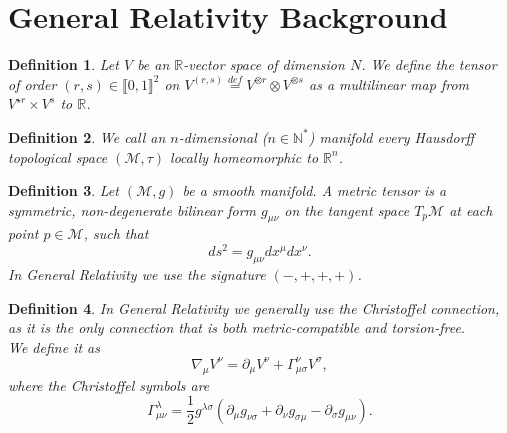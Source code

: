 \documentclass{article}
\newtheorem{definition}{Definition}
\begin{document}
\section{General Relativity Background} \label{RGreminder}
\begin{definition}
Let $V$ be an $\mathbb{R}$-vector space of dimension $N$. We define the tensor of order $(r,s) \in  \llbracket 0 ,1 \rrbracket^2$ on $V^{(r,s)} \overset{def}{=} V^{\otimes r} \otimes V^{\otimes s}$
as a multilinear map from $ V^{\star r} \times V^{ s}$ to $\mathbb{R}$.
 \end{definition}
\begin{definition}
    We call an $n$-dimensional ($n \in \mathbb{N}^*$) manifold every Hausdorff topological space $(\mathcal{M},\tau )$ locally homeomorphic to $\mathbb{R}^n$.
\end{definition}
\begin{definition}
    Let $(\mathcal{M}, g)$ be a smooth manifold. A metric tensor is a symmetric,
    non-degenerate bilinear form $g_{\mu\nu}$ on the tangent space $T_p\mathcal{M}$
    at each point $p \in \mathcal{M}$, such that
    \begin{equation*}
        ds^2 = g_{\mu\nu} dx^\mu dx^\nu.
    \end{equation*}
    In General Relativity we use the signature $(-,+,+,+)$.
\end{definition}
\begin{definition}
   In General Relativity we generally use the Christoffel connection, as it is the only connection that is both metric-compatible and torsion-free.\\
   We define it as
   \begin{equation}
    \nabla_{\mu}V^{\nu}= \partial_{\mu}V^{\nu}+\Gamma^{\nu}_{\mu \sigma}V^{\sigma},
   \end{equation}
   where the Christoffel symbols are
   \begin{equation}
    \Gamma_{\mu \nu}^{\lambda} = \frac{1}{2}g^{\lambda \sigma}(\partial_{\mu}g_{\nu \sigma}+\partial_{\nu}g_{\sigma \mu} - \partial_{\sigma}g_{\mu \nu}).
   \end{equation}
\end{definition}
\end{document}
